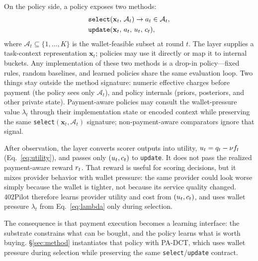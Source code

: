 On the policy side, a policy exposes two methods:
\begin{align*}
&\mathtt{select}(\mathbf{x}_t,\, \mathcal{A}_t) \to a_t \in \mathcal{A}_t, \\
&\mathtt{update}(\mathbf{x}_t,\, a_t,\, u_t,\, c_t),
\end{align*}
where $\mathcal{A}_t \subseteq \{1, \ldots, K\}$ is the wallet-feasible subset at round $t$. The layer supplies a task-context representation $\mathbf{x}_t$; policies may use it directly or map it to internal buckets. Any implementation of these two methods is a drop-in policy---fixed rules, random baselines, and learned policies share the same evaluation loop. Two things stay outside the method signature: numeric effective charges before payment (the policy sees only $\mathcal{A}_t$), and policy internals (priors, posteriors, and other private state). Payment-aware policies may consult the wallet-pressure value $\lambda_t$ through their implementation state or encoded context while preserving the same \texttt{select}$(\mathbf{x}_t,\mathcal{A}_t)$ signature; non-payment-aware comparators ignore that signal.

After observation, the layer converts scorer outputs into utility, $u_t=q_t-\nu f_t$ (Eq.~\eqref{eq:utility}), and passes only $(u_t,c_t)$ to \texttt{update}. It does not pass the realized payment-aware reward $r_t$. That reward is useful for scoring decisions, but it mixes provider behavior with wallet pressure: the same provider could look worse simply because the wallet is tighter, not because its service quality changed. 402Pilot therefore learns provider utility and cost from $(u_t,c_t)$, and uses wallet pressure $\lambda_t$ from Eq.~\eqref{eq:lambda} only during selection.

The consequence is that payment execution becomes a learning interface: the substrate constrains what can be bought, and the policy learns what is worth buying. \S\ref{sec:method} instantiates that policy with PA-DCT, which uses wallet pressure during selection while preserving the same \texttt{select}/\texttt{update} contract.
